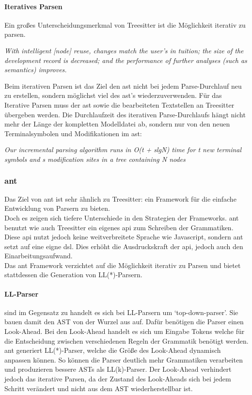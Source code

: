 \documentclass[./einleitung.tex]{subfiles}
\begin{document}
\paragraph{Iteratives Parsen}
Ein großes Unterscheidungsmerkmal von Treesitter ist die Möglichkeit iterativ zu parsen.
\newline
 \begin{center}
 \textit{With intelligent [node] reuse, changes match the user’s in
tuition; the size of the development record is decreased; and the performance
 of further analyses (such as semantics) improves.\cite{twagner}}
 \end{center}
Beim iterativen Parsen ist das Ziel den \acrshort{ast} nicht bei jedem Parse-Durchlauf neu zu erstellen, sondern möglichst viel des \acrshort{ast}'s wiederzuverwenden.
Für das Iterative Parsen muss der \acrshort{ast} sowie die bearbeiteten Textstellen an Treesitter übergeben werden.
Die Durchlaufzeit des iterativen Parse-Durchlaufs hängt nicht mehr der Länge der kompletten Modelldatei ab, sondern nur von den neuen Terminalsymbolen und Modifikationen im \acrshort{ast}:
 \newline
 \begin{center}
 \textit{Our incremental parsing algorithm runs in O(t + slgN) time for t new terminal symbols and s modification sites in a tree containing N nodes \cite{twagner}}
 \end{center}
\subsubsection{\acrfull{ant}}
Das Ziel von \acrshort{ant} ist sehr ähnlich zu Treesitter: ein Framework für die einfache Entwicklung von Parsern zu bieten. \\
Doch es zeigen sich tiefere Unterschiede in den Strategien der Frameworks.
\acrshort{ant} benutzt wie auch Treesitter ein eigenes \acrfull{api} zum Schreiben der Grammatiken.
Diese \acrshort{api} nutzt jedoch keine weitverbreitete Sprache wie Javascript, sondern \acrshort{ant} setzt auf eine eigne \acrfull{dsl}.
Dies erhöht die Ausdruckskraft der \acrshort{api}, jedoch auch den Einarbeitungsaufwand.\\
Das \acrshort{ant} Framework verzichtet auf die Möglichkeit iterativ zu Parsen und bietet stattdessen die Generation von LL(*)-Parsern.

\paragraph{LL-Parser} sind im Gegensatz zu  handelt es sich bei LL-Parsern um `top-down-parser'.
Sie bauen damit den AST von der Wurzel aus auf.
Dafür benötigen die Parser einen Look-Ahead.
Bei den Look-Ahead handelt es sich um Eingabe Tokens welche für die Entscheidung zwischen verschiedenen Regeln der Grammatik benötigt werden.
\acrshort{ant} generiert LL(*)-Parser, welche die Größe des Look-Ahead dynamisch anpassen können.
So können die Parser deutlich mehr Grammatiken verarbeiten und produzieren bessere ASTs als LL(k)-Parser. \cite{parr2011ll}
Der Look-Ahead verhindert jedoch das iterative Parsen, da der Zustand des Look-Aheads sich bei jedem Schritt verändert und nicht aus dem AST wiederherstellbar ist.
\end{document}
